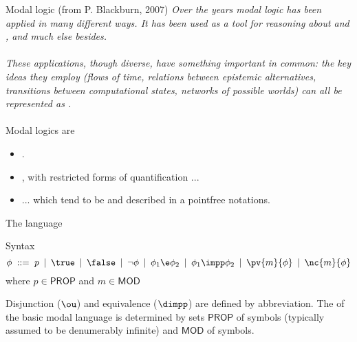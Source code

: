 \documentclass{beamer}
\begin{document}
\begin{slide}{Modal logic (from P. Blackburn, 2007)}\label{s:9}
\small
\emph{Over the years modal logic has been applied in many different ways. It has been used as a tool for reasoning about  and , and much else besides. \\
~\\

These applications, though diverse, have something important in common: the key ideas they employ (flows of time, relations between epistemic alternatives, transitions between computational states, networks of possible worlds) can all be represented as .  }
~\\
~\\

Modal logics are
\begin{itemize}
\item  {}.
\item  {}, with restricted forms of quantification ...
\item  ... which tend to be  and described in a pointfree notations.
\end{itemize}
\end{slide}



\begin{slide}{The language}\label{s:10}
\small
\begin{block}{Syntax}
\begin{equation*}
\phi\; ::=\; p \: \mid\: \true\: \mid\: \false\: \mid\: \neg \phi \: \mid\: \phi_1 \e \phi_2\: \mid\:
           \phi_1 \impp  \phi_2\:   \mid\:
           \pv{m}{\phi} \:  \mid\:
           \nc{m}{\phi} 
\end{equation*}
where $p \in \mathsf{PROP}$ and $m \in \mathsf{MOD}$
\end{block}
\vspace{1cm}

Disjunction ($\ou$) and equivalence ($\dimpp$) are defined by abbreviation.
The  of the basic modal language is determined by sets $\mathsf{PROP}$ of  symbols (typically assumed to be denumerably infinite) and $\mathsf{MOD}$ of  symbols.
\end{slide}
\end{document}
